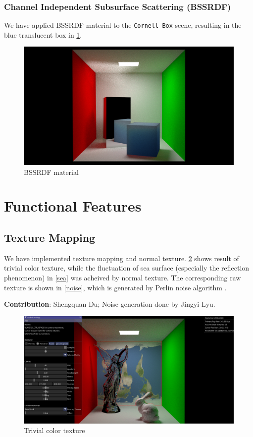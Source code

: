 \documentclass[acmtog]{acmart}
\begin{document}
\subsubsection{Channel Independent Subsurface Scattering (BSSRDF)}

We have applied BSSRDF material to the \verb|Cornell Box| scene, resulting in the blue translucent box in \ref{bssrdf}.

\begin{figure}[h]
	\centering	
	\includegraphics[width=\linewidth]{bssrdf}
	\caption{BSSRDF material}
	\label{bssrdf}
\end{figure}

\section{Functional Features}

\subsection{Texture Mapping}

We have implemented texture mapping and normal texture. \ref{color_texture} shows result of trivial color texture, while the fluctuation of sea surface (especially the reflection phenomenon) in \ref{sea} was acheived by normal texture. The corresponding raw texture is shown in \ref{noise}, which is generated by Perlin noise algorithm \cite{perlin_noise}.

\noindent \textbf{Contribution}: Shengquan Du; Noise generation done by Jingyi Lyu.

\begin{figure}[h]
	\centering	
	\includegraphics[width=\linewidth]{color_texture}
	\caption{Trivial color texture}
	\label{color_texture}
\end{figure}
\end{document}
